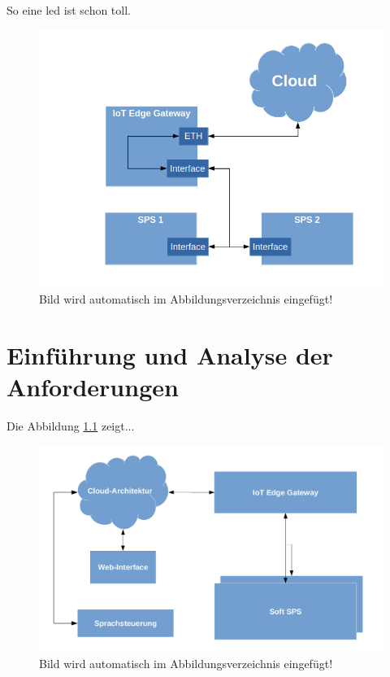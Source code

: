 So eine \gls{led} ist schon toll.

\begin{figure}[H]
\includegraphics[scale=0.5]{pictures/GatewayKommunikation.png} 
\caption{Bild wird automatisch im Abbildungsverzeichnis eingefügt!}
\label{fig:gateway}
\end{figure}


\chapter{Einführung und Analyse der Anforderungen}
Die Abbildung \ref{fig:archgrob} zeigt...
\begin{figure}[H]
\includegraphics[scale=0.3]{pictures/Architektur-grob.png} 
\caption{Bild wird automatisch im Abbildungsverzeichnis eingefügt!}
\label{fig:archgrob}
\end{figure}


